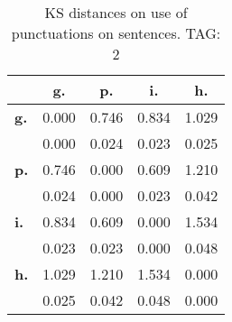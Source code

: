 \begin{table}[h!]
\begin{center}
\begin{tabular}{| l || c | c | c | c |}\hline
 & {\bf g.} & {\bf p.} & {\bf i.} & {\bf h.} \\\hline\hline
{\bf g.} & 0.000 & 0.746 & 0.834 & 1.029 \\
{\bf } & 0.000 & 0.024 & 0.023 & 0.025 \\\hline
{\bf p.} & 0.746 & 0.000 & 0.609 & 1.210 \\
{\bf } & 0.024 & 0.000 & 0.023 & 0.042 \\\hline
{\bf i.} & 0.834 & 0.609 & 0.000 & 1.534 \\
{\bf } & 0.023 & 0.023 & 0.000 & 0.048 \\\hline
{\bf h.} & 1.029 & 1.210 & 1.534 & 0.000 \\
{\bf } & 0.025 & 0.042 & 0.048 & 0.000 \\\hline
\end{tabular}
\caption{KS distances on use of punctuations on sentences. TAG: 2}
\end{center}
\end{table}